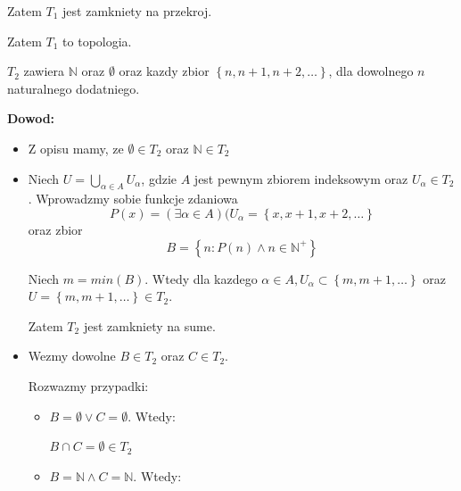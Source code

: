 \documentclass{article}
\begin{document}
\begin{enumerate}
\begin{itemize}
\begin{itemize}
\begin{itemize}
                        \end{itemize}%
                \end{itemize}%
                Zatem $T_{1}$ jest zamkniety na przekroj.

                Zatem $T_{1}$ to topologia.
        \end{itemize}%

        \begin{tcolorbox}[colback=white!90!red,colframe=black!35!red,title=Definicja:\textbf{Final segment topology}; poki co brak polskiego tlumaczenia]
            $T_{2}$ zawiera $\mathbb{N}$ oraz $\emptyset$ oraz kazdy zbior $\left\{n, n+1, n+2,\dots \right\}$, dla dowolnego $n$ naturalnego dodatniego.
        \end{tcolorbox}
        \textbf{Dowod:}

        \begin{itemize}%

            \item Z opisu mamy, ze $\emptyset \in T_{2}$ oraz $\mathbb{N} \in T_{2}$
            \item Niech $U = \bigcup\limits_{\alpha \in A}U_{\alpha}$, gdzie $A$ jest pewnym zbiorem indeksowym oraz $U_{\alpha} \in T_{2}$. Wprowadzmy sobie funkcje zdaniowa
                $$P(x) = (\exists \alpha \in A)(U_{\alpha} = \left\{x, x+1, x+2, \dots\right\}$$
                oraz zbior
                $$B = \left\{n: P(n) \land n \in {\mathbb{N}}^{+}\right\}$$

                Niech $m = min(B)$. Wtedy dla kazdego $\alpha \in A, U_{\alpha} \subset \left\{m, m+1, \dots\right\}$ oraz $U = \left\{m, m+1, \dots\right\} \in T_{2}$.

                Zatem $T_{2}$ jest zamkniety na sume.

            \item Wezmy dowolne $B \in T_{2}$ oraz $C \in T_{2}$.

                Rozwazmy przypadki:

                \begin{itemize}%

                    \item $B = \emptyset \lor C = \emptyset$. Wtedy:

                        $B\cap C = \emptyset \in T_{2}$
                    \item $B = \mathbb{N} \land C = \mathbb{N}$. Wtedy:


\end{itemize}
\end{itemize}
\end{enumerate}
\end{document}
